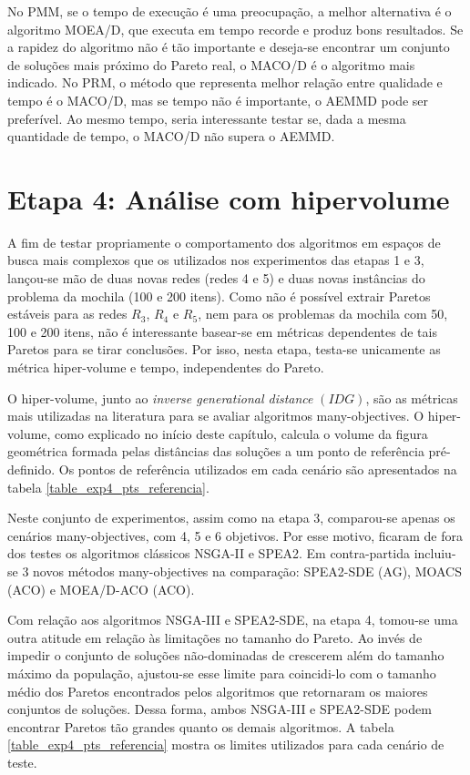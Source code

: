 No PMM, se o tempo de execução é uma preocupação, a melhor alternativa é o algoritmo MOEA/D, que executa em tempo recorde e produz bons resultados. Se a rapidez do algoritmo não é tão importante e deseja-se encontrar um conjunto de soluções mais próximo do Pareto real, o MACO/D é o algoritmo mais indicado. No PRM, o método que representa melhor relação entre qualidade e tempo é o MACO/D, mas se tempo não é importante, o AEMMD pode ser preferível. Ao mesmo tempo, seria interessante testar se, dada a mesma quantidade de tempo, o MACO/D não supera o AEMMD.

\section{Etapa 4: Análise com hipervolume}
\label{section_experimentos_etapa4}

A fim de testar propriamente o comportamento dos algoritmos em espaços de busca mais complexos que os utilizados nos experimentos das etapas 1 e 3, lançou-se mão de duas novas redes (redes 4 e 5) e duas novas instâncias do problema da mochila (100 e 200 itens). Como não é possível extrair Paretos estáveis para as redes $R_3$, $R_4$ e $R_5$, nem para os problemas da mochila com 50, 100 e 200 itens, não é interessante basear-se em métricas dependentes de tais Paretos para se tirar conclusões. Por isso, nesta etapa, testa-se unicamente as métrica hiper-volume e tempo, independentes do Pareto.

O hiper-volume, junto ao \textit{inverse generational distance} $(IDG)$, são as métricas mais utilizadas na literatura para se avaliar algoritmos many-objectives. O hiper-volume, como explicado no início deste capítulo, calcula o volume da figura geométrica formada pelas distâncias das soluções a um ponto de referência pré-definido. Os pontos de referência utilizados em cada cenário são apresentados na tabela \ref{table_exp4_pts_referencia}.

Neste conjunto de experimentos, assim como na etapa 3, comparou-se apenas os cenários many-objectives, com 4, 5 e 6 objetivos. Por esse motivo, ficaram de fora dos testes os algoritmos clássicos NSGA-II e SPEA2. Em contra-partida incluiu-se 3 novos métodos many-objectives na comparação: SPEA2-SDE (AG), MOACS (ACO) e MOEA/D-ACO (ACO).

Com relação aos algoritmos NSGA-III e SPEA2-SDE, na etapa 4, tomou-se uma outra atitude em relação às limitações no tamanho do Pareto. Ao invés de impedir o conjunto de soluções não-dominadas de crescerem além do tamanho máximo da população, ajustou-se esse limite para coincidi-lo com o tamanho médio dos Paretos encontrados pelos algoritmos que retornaram os maiores conjuntos de soluções. Dessa forma, ambos NSGA-III e SPEA2-SDE podem encontrar Paretos tão grandes quanto os demais algoritmos. A tabela \ref{table_exp4_pts_referencia} mostra os limites utilizados para cada cenário de teste.

